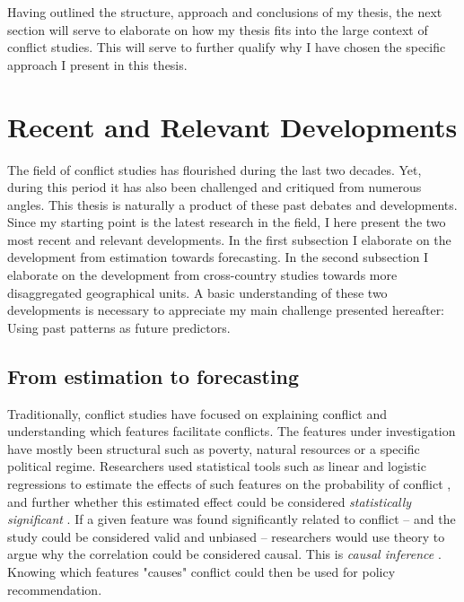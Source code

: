 \documentclass[a4paper]{article}
\begin{document}
Having outlined the structure, approach and conclusions of my thesis, the next section will serve to elaborate on how my thesis fits into the large context of conflict studies. This will serve to further qualify why I have chosen the specific approach I present in this thesis.\par

\section{Recent and Relevant Developments}\label{challenges}


The field of conflict studies has flourished during the last two decades. Yet, during this period it has also been challenged and critiqued from numerous angles. This thesis is naturally a product of these past debates and developments. Since my starting point is the latest research in the field, I here present the two most recent and relevant developments. In the first subsection I elaborate on the development from estimation towards forecasting. In the second subsection I elaborate on the development from cross-country studies towards more disaggregated geographical units. A basic understanding of these two developments is necessary to appreciate my main challenge presented hereafter: Using past patterns as future predictors.\par

\subsection{From estimation to forecasting}\label{est_to_pred} %

Traditionally, conflict studies have focused on explaining conflict and understanding which features facilitate conflicts. The features under investigation have mostly been structural such as poverty, natural resources or a specific political regime. Researchers used statistical tools such as linear and logistic regressions to estimate the effects of such features on the probability of conflict \citep[8]{chadefaux2017conflict}, and further whether this estimated effect could be considered \emph{statistically significant} \citep[363-364]{Ward_Greenhill_Bakke_2010}. If a given feature was found significantly related to conflict -- and the study could be considered valid and unbiased -- researchers would use theory to argue why the correlation could be considered causal. This is \emph{causal inference} \citep[8]{chadefaux2017conflict}. Knowing which features "causes" conflict could then be used for policy recommendation.\par
\end{document}
